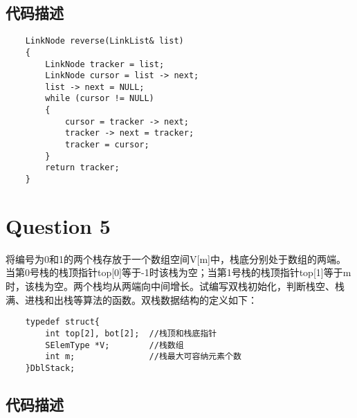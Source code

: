 \documentclass{article}
\begin{document}
\subsection{代码描述}

\begin{verbatim}
    LinkNode reverse(LinkList& list)
    {
        LinkNode tracker = list;
        LinkNode cursor = list -> next;
        list -> next = NULL;
        while (cursor != NULL)
        {
            cursor = tracker -> next;
            tracker -> next = tracker;
            tracker = cursor;
        }
        return tracker;
    }

\end{verbatim}

\section{Question 5} 


将编号为0和1的两个栈存放于一个数组空间V[m]中，栈底分别处于数组的两端。当第0号栈的栈顶指针top[0]等于-1时该栈为空；当第1号栈的栈顶指针top[1]等于m时，该栈为空。两个栈均从两端向中间增长。试编写双栈初始化，判断栈空、栈满、进栈和出栈等算法的函数。双栈数据结构的定义如下：\par
\begin{verbatim}
    typedef struct{
        int top[2], bot[2];  //栈顶和栈底指针
        SElemType *V;        //栈数组 
        int m;               //栈最大可容纳元素个数
    }DblStack;
\end{verbatim}


\subsection{代码描述}
\end{document}
